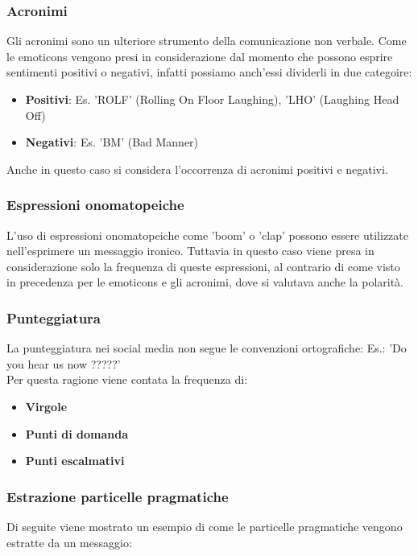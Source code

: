 \documentclass[oneside]{book}
\begin{document}
\subsubsection{Acronimi}
Gli acronimi sono un ulteriore strumento della comunicazione non verbale. Come le emoticons vengono presi in considerazione dal momento che possono esprire sentimenti positivi o negativi, infatti possiamo anch'essi dividerli in due categoire:

\begin{itemize}
	\item
	\textbf{Positivi}: Es. 'ROLF' (Rolling On Floor Laughing), 'LHO' (Laughing Head Off)
	\item
	\textbf{Negativi}: Es. 'BM' (Bad Manner)
\end{itemize}
Anche in questo caso si considera l'occorrenza di acronimi positivi e negativi.

\subsubsection{Espressioni onomatopeiche}
L'uso di espressioni onomatopeiche come 'boom' o 'clap' possono essere utilizzate nell'esprimere un messaggio ironico. Tuttavia in questo caso viene presa in considerazione solo la frequenza di queste espressioni, al contrario di come visto in precedenza per le emoticons e gli acronimi, dove si valutava anche la polarità.

\subsubsection{Punteggiatura}
La punteggiatura nei social media non segue le convenzioni ortografiche: Es.: 'Do you hear us now ?????'\\
Per questa ragione viene contata la frequenza di:
\begin{itemize}
	\item \textbf{Virgole}
	
	\item \textbf{Punti di domanda}
	
	\item \textbf{ Punti escalmativi}
\end{itemize}

\subsubsection{Estrazione particelle pragmatiche}
Di seguite viene mostrato un esempio di come le particelle pragmatiche vengono estratte da un messaggio:
\end{document}
